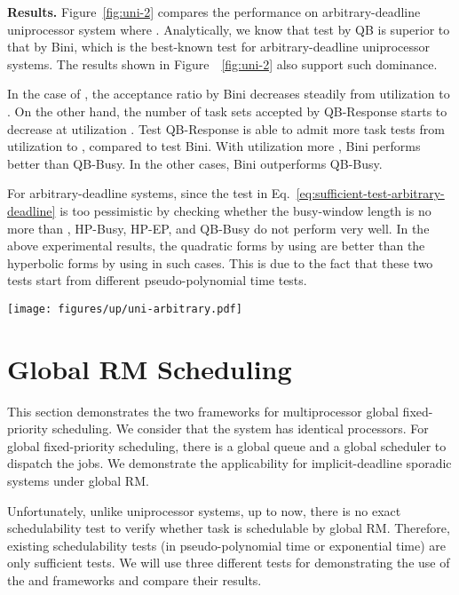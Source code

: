 \documentclass[10pt,conference]{IEEEtran}
\newcommand{\frameworkkq}[1]{}
\newcommand{\frameworkku}[1]{}
\begin{document}
{\noindent \bf Results.}  Figure~\ref{fig:uni-2} compares the
performance on arbitrary-deadline uniprocessor system where
.  
Analytically, we know that test by QB is superior to that by Bini,
which is the best-known test for arbitrary-deadline uniprocessor
systems.  The results shown in Figure~~\ref{fig:uni-2} also support
such dominance.

In the case of , the acceptance ratio by Bini decreases steadily from utilization  to .
On the other hand, the number of task sets accepted by QB-Response starts to decrease at utilization . Test QB-Response is able to admit more task tests from utilization  to , compared to test Bini. With utilization more , Bini performs better than QB-Busy. In the other cases, Bini outperforms QB-Busy.

For arbitrary-deadline systems, since the test in
Eq.~\eqref{eq:sufficient-test-arbitrary-deadline} is too pessimistic
by checking whether the busy-window length is no more than ,
HP-Busy, HP-EP, and QB-Busy do not perform very well. In the above
experimental results, the quadratic forms by using \frameworkkq{} are
better than the hyperbolic forms by using \frameworkku{} in such
cases. This is due to the fact that these two tests start from
different pseudo-polynomial time tests.





\begin{figure*}[t]
  \centering
   \texttt{[image: figures/up/uni-arbitrary.pdf]}
  \caption{Performance evaluation on uniprocessor systems in terms of acceptance ratio for arbitrary-deadline uniprocessor systems where }
    \label{fig:uni-2}
\end{figure*}

\section{Global RM Scheduling}
\label{sec:global-sporadic}

This section demonstrates the two frameworks 
for multiprocessor global fixed-priority scheduling. We consider that
the system has  identical processors. For global fixed-priority
scheduling, there is a global queue and a global scheduler to dispatch
the jobs. We demonstrate the applicability for implicit-deadline
sporadic systems under global RM.

Unfortunately, unlike uniprocessor systems, up to now, there is no
exact schedulability test to verify whether task  is schedulable
by global RM.  Therefore, existing schedulability
tests (in pseudo-polynomial time or exponential time) are only
sufficient tests. We will use three different tests for demonstrating
the use of the \frameworkku{} and \frameworkkq{} frameworks and compare their results.
\end{document}
